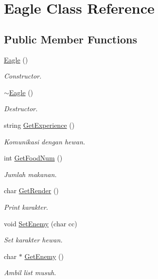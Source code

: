 \hypertarget{class_eagle}{}\section{Eagle Class Reference}
\label{class_eagle}
\subsection*{Public Member Functions}
\begin{DoxyCompactItemize}
\item 
\hyperlink{class_eagle_a8b205e5b26bece07d18b852b042851fe}{Eagle} ()\hypertarget{class_eagle_a8b205e5b26bece07d18b852b042851fe}{}\label{class_eagle_a8b205e5b26bece07d18b852b042851fe}

\begin{DoxyCompactList}\small\item\em Constructor. \end{DoxyCompactList}\item 
\hyperlink{class_eagle_a192a898182736506c1f78159bf3477b7}{$\sim$\+Eagle} ()\hypertarget{class_eagle_a192a898182736506c1f78159bf3477b7}{}\label{class_eagle_a192a898182736506c1f78159bf3477b7}

\begin{DoxyCompactList}\small\item\em Destructor. \end{DoxyCompactList}\item 
string \hyperlink{class_eagle_abba7200880762e44c4d4efd022b4fdf5}{Get\+Experience} ()\hypertarget{class_eagle_abba7200880762e44c4d4efd022b4fdf5}{}\label{class_eagle_abba7200880762e44c4d4efd022b4fdf5}

\begin{DoxyCompactList}\small\item\em Komunikasi dengan hewan. \end{DoxyCompactList}\item 
int \hyperlink{class_eagle_a17c7f9dee204950dbdfae50b9ac3b109}{Get\+Food\+Num} ()
\begin{DoxyCompactList}\small\item\em Jumlah makanan. \end{DoxyCompactList}\item 
char \hyperlink{class_eagle_a3c1666b9eb07da8a1f45a230f72c7e14}{Get\+Render} ()
\begin{DoxyCompactList}\small\item\em Print karakter. \end{DoxyCompactList}\item 
void \hyperlink{class_eagle_ac6aec7ed7fe21d00009ef2fdfa89e906}{Set\+Enemy} (char cc)
\begin{DoxyCompactList}\small\item\em Set karakter hewan. \end{DoxyCompactList}\item 
char $\ast$ \hyperlink{class_eagle_ae236ae54ae034fe9a28c16b5da250351}{Get\+Enemy} ()
\begin{DoxyCompactList}\small\item\em Ambil list musuh. \end{DoxyCompactList}\end{DoxyCompactItemize}
